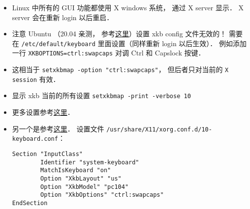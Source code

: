 
\begin{issues}
\issueDraft
\end{issues}

\begin{itemize}
\item Linux 中所有的 GUI 功能都使用 X windows 系统， 通过 X server 显示． X server 会在重新 login 以后重启．
\item 注意 Ubuntu （20.04 亲测， 参考\href{https://manpages.ubuntu.com/manpages/focal/en/man5/keyboard.5.html}{这里}）设置 xkb config 文件无效的！ 需要在 \verb|/etc/default/keyboard| 里面设置（同样重新 login 以后生效）． 例如添加一行 \verb|XKBOPTIONS=ctrl:swapcaps| 对调 Ctrl 和 Capslock 按键．
\item 这相当于 \verb|setxkbmap -option "ctrl:swapcaps"|， 但后者只对当前的 \verb|X session| 有效．
\item 显示 xkb 当前的所有设置 \verb|setxkbmap -print -verbose 10|
\item 更多设置参考\href{https://gist.github.com/jatcwang/ae3b7019f219b8cdc6798329108c9aee}{这里}．
\item 另一个是参考\href{https://www.linux.com/training-tutorials/hacking-your-linux-keyboard-xkb/}{这里}． 设置文件 \verb`/usr/share/X11/xorg.conf.d/10-keyboard.conf`：
\begin{lstlisting}[language=none]
Section "InputClass"
        Identifier "system-keyboard"
        MatchIsKeyboard "on"
        Option "XkbLayout" "us"
        Option "XkbModel" "pc104"
        Option "XkbOptions" "ctrl:swapcaps"
EndSection
\end{lstlisting}
\end{itemize}
